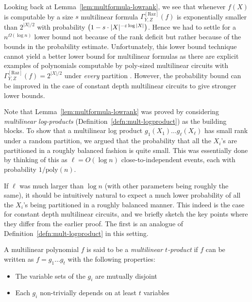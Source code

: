 \documentclass[12pt]{report}
\newcommand{\CM}[1]{\Gamma^{\mathrm{[#1]}}}
\renewcommand{\epsilon}{\varepsilon}
\begin{document}
Looking back at Lemma~\ref{lem:multformula-lowrank}, we see that whenever $f(X)$ is computable by a size $s$ multilinear formula $\CM{Raz}_{Y,Z}(f)$ is exponentially smaller than $2^{|X|/2}$ with probability $\inparen{1 - s\cdot |X|^{-\epsilon \log |X|}}$. Hence we had to settle for a $n^{\Omega(\log n)}$ lower bound not because of the rank deficit but rather because of the bounds in the probability estimate. Unfortunately, this lower bound technique cannot yield a better lower bound for multilinear formulas as there are explicit examples of polynomials computable by poly-sized multilinear circuits with $\CM{Raz}_{Y,Z}(f) = 2^{|X|/2}$ under \emph{every} partition \cite{Raz06}. However, the probability bound can be improved in the case of constant depth multilinear circuits to give stronger lower bounds. 


Note that Lemma~\ref{lem:multformula-lowrank} was proved by considering \emph{multilinear log-products} (Definition~\ref{defn:mult-logproduct}) as the building blocks. To show that a multilinear log product $g_1(X_1)\dots g_{\ell}(X_\ell)$ has small rank under a random partition, we argued that the probability that all the $X_i$'s are partitioned in a roughly balanced fashion is quite small. This was essentially done by thinking of this as $\ell = O(\log n)$ close-to-independent events, each with probability $1/\mathrm{poly}(n)$. 

If $\ell$ was much larger than $\log n$ (with other parameters being roughly the same), it should be intuitively natural to expect a much lower probability of all the $X_i$'s being partitioned in a roughly balanced manner. This indeed is the case for constant depth multilinear circuits, and we briefly sketch the key points where they differ from the earlier proof. The first is an analogue of Definition~\ref{defn:mult-logproduct} in this setting. 

\begin{definition}\label{defn:mult-t-prod}
A multilinear polynomial $f$ is said to be a \emph{multilinear $t$-product} if $f$ can be written as $f = g_1\dots g_t$ with the following properties:
\begin{itemize}
\item The variable sets of the $g_i$ are mutually disjoint
\item Each $g_i$ non-trivially depends on at least $t$ variables
\end{itemize}
\end{definition}
\end{document}
